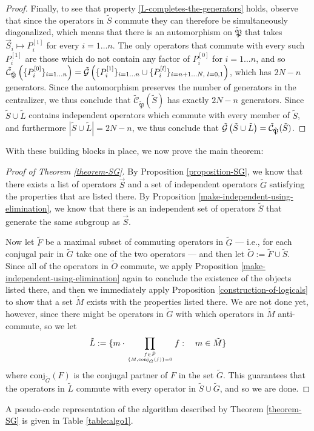 \documentclass[twocolumn,showpacs,preprintnumbers,amsmath,amssymb,nofootinbib,pra,floatfix]{revtex4-1}
\newenvironment{remark}[1][Remark]{\begin{trivlist}
\item[\hskip \labelsep {\bfseries #1}]}{\end{trivlist}}
\newcommand{\lst}{\vec}
\newcommand{\set}{\tilde}
\newcommand{\genfun}{\tilde{\mathcal{G}}}
\newcommand{\pauligroup}{{\set{\mathfrak{P}}}}
\newcommand{\centralizer}{\set{\mathcal{C}}}
\begin{document}
\begin{proof}
Finally, to see that property \ref{L-completes-the-generators} holds, observe that since the operators in $\set S$ commute they can therefore be simultaneously diagonalized, which means that there is an automorphism on $\pauligroup$ that takes $\lst S_i\mapsto P_i^{[1]}$ for every $i=1 \dots n$.  The only operators that commute with every such $P_i^{[1]}$ are those which do not contain any factor of $P_i^{[0]}$ for $i=1 \dots n$, and so $\centralizer_\pauligroup\paren{\{P_i^{[0]}\}_{i=1\dots n}} = \genfun\paren{\{P_i^{[1]}\}_{i=1 \dots n}\cup \{P_i^{[l]}\}_{i=n+1 \dots N, \,\, l=0,1}}$, which has $2N-n$ generators.  Since the automorphism preserves the number of generators in the centralizer, we thus conclude that $\centralizer_\pauligroup(\set S)$ has exactly $2N-n$ generators.  Since $\set S\cup\set L$ contains independent operators which commute with every member of $\set S$, and furthermore $|\set S\cup\set L|=2N-n$, we thus conclude that $\genfun\paren{\set S\cup\set L}=\centralizer_\pauligroup(\set S)$.
\end{proof}
With these building blocks in place, we now prove the main theorem:

\begin{proof}[Proof of Theorem \ref{theorem-SG}]
By Proposition \ref{proposition-SG}, we know that there exists a list of operators $\lst S$ and a set of independent operators $\set G$ satisfying the properties that are listed there.  By Proposition \ref{make-independent-using-elimination}, we know that there is an independent set of operators $\set S$ that generate the same subgroup as $\lst S$.  

Now let $\set F$ be a maximal subset of commuting operators in $\set G$ --- i.e., for each conjugal pair in $\set G$ take one of the two operators --- and then let $\set O := \set F \cup \set S$.  Since all of the operators in $\set O$ commute, we apply Proposition \ref{make-independent-using-elimination} again to conclude the existence of the objects listed there, and then we immediately apply Proposition \ref{construction-of-logicals} to show that a set $\set M$ exists with the properties listed there.  We are not done yet, however, since there might be operators in $\set G$ with which operators in $\set M$ anti-commute, so we let
$$\set L := \{m\cdot\prod_{f\in \set F\atop \{M,\text{conj}_{\set G}(f)\}=0} f :\quad m \in\set M\}$$
where $\text{conj}_{\set G}(F)$ is the conjugal partner of $F$ in the set $\set G$.  This guarantees that the operators in $\set L$ commute with every operator in $\set S\cup\set G$, and so we are done.
\end{proof}
\begin{remark}
A pseudo-code representation of the algorithm described by Theorem \ref{theorem-SG} is given in Table \ref{table:algo1}.
\end{remark}
\end{document}
